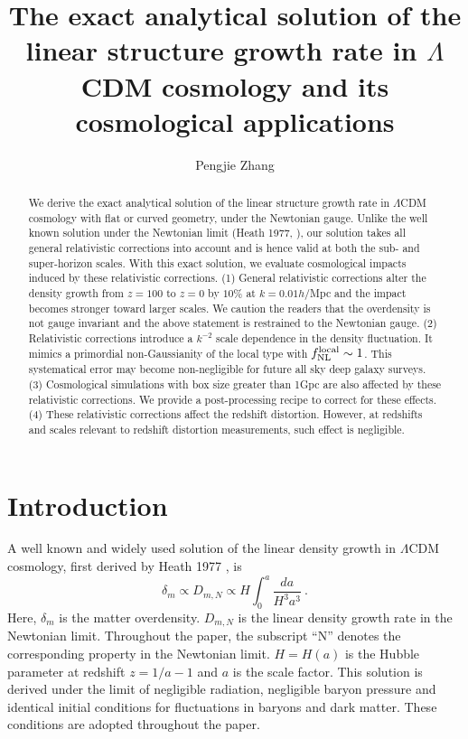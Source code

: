 \documentclass[aps,prl,showpacs,nobibnotes,twocolumn,
nobalancelastpage,superscriptaddress]{revtex4}
\newcommand{\be}{\begin{equation}}
\newcommand{\ee}{\end{equation}}
\begin{document}
\title{The exact analytical solution of the linear structure growth rate in
  $\Lambda$CDM cosmology and its cosmological applications}
\author{Pengjie Zhang}
\begin{abstract}
We derive the exact analytical solution of the linear structure growth rate in
$\Lambda$CDM cosmology with flat or curved geometry, under the Newtonian gauge. Unlike the well known
solution under the Newtonian limit (Heath 1977, \cite{Heath77}),  our solution takes all
general relativistic corrections into account and is hence valid at both the
sub- and super-horizon  scales. With this exact solution, we evaluate
cosmological impacts induced by these relativistic corrections.  (1) General
relativistic corrections alter the density growth from $z=100$ to $z=0$ by $10\%$ at
$k=0.01h/$Mpc and the impact becomes stronger toward larger scales. We
caution the readers that the overdensity is not gauge invariant and the above
statement is restrained to the Newtonian gauge.  (2) Relativistic corrections  introduce a  $k^{-2}$ scale dependence
in  the density fluctuation. It mimics a primordial non-Gaussianity of the local type
with $f^{\rm local}_{\rm  NL}\sim 1$. This  systematical error may become
non-negligible for  future all sky deep galaxy surveys. (3) Cosmological
simulations with box size greater 
than 1Gpc are also affected by these relativistic corrections. We provide a
post-processing recipe  to correct for these effects. (4) These
relativistic corrections affect the redshift distortion. However, at
redshifts and scales relevant to redshift distortion measurements, such effect
is negligible. 
\end{abstract}
\maketitle

\section{Introduction}
A well known and widely used solution of the linear density growth in
$\Lambda$CDM cosmology, first derived
by Heath 1977 \cite{Heath77},  is
\be
\label{eqn:Heath77}
\delta_m\propto D_{m,N}\propto H\int_0^a \frac{da}{H^3a^3}\ .
\ee
Here, $\delta_m$ is the matter overdensity. $D_{m,N}$ is the linear density
growth rate in the Newtonian limit. Throughout the paper, the subscript
``N'' denotes the corresponding property in the Newtonian limit. $H=H(a)$ is the Hubble parameter at redshift $z=1/a-1$ and $a$ is the
scale factor. This solution is derived under the limit of
negligible radiation, negligible baryon pressure and  identical initial
conditions for fluctuations in baryons and dark matter. These conditions are
adopted throughout the paper. 
\end{document}
